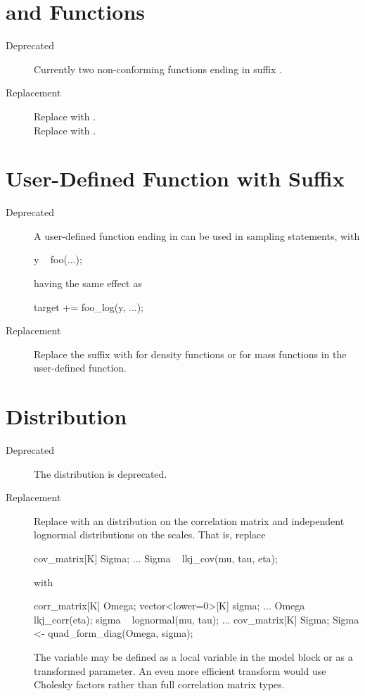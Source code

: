 \section{ and  Functions}

\begin{description}
\item[Deprecated]  Currently two non-conforming functions ending in
  suffix .
\item[Replacement] Replace  with
  .
\\[4pt]
Replace  with .
\end{description}

\section{User-Defined Function with  Suffix}

\begin{description}
\item[Deprecated] A user-defined function ending in  can
  be used in sampling statements, with
%
\begin{stancode}
y ~ foo(...);
\end{stancode}
%
having the same effect as
%
\begin{stancode}
target += foo_log(y, ...);
\end{stancode}
\item[Replacement]
Replace the  suffix with  for
density functions or  for mass functions in the
user-defined function.
\end{description}

\section{ Distribution}

\begin{description}
\item[Deprecated]The distribution  is deprecated.
\item[Replacement] Replace  with an
   distribution on the correlation matrix and
  independent lognormal distributions on the scales.  That is,
  replace
\begin{stancode}
cov_matrix[K] Sigma;
...
Sigma ~ lkj_cov(mu, tau, eta);
\end{stancode}
  with
\begin{stancode}
corr_matrix[K] Omega;
vector<lower=0>[K] sigma;
...
Omega ~ lkj_corr(eta);
sigma ~ lognormal(mu, tau);
...
cov_matrix[K] Sigma;
Sigma <- quad_form_diag(Omega, sigma);
\end{stancode}
The variable  may be defined as a local variable in the
model block or as a transformed parameter.  An even more efficient
transform would use Cholesky factors rather than full correlation
matrix types.
\end{description}

